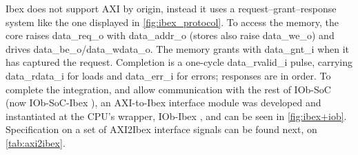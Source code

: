 Ibex does not support AXI by origin, instead it uses a request–grant–response system like the one displayed in \cref{fig:ibex_protocol}. To access the memory, the core raises data\_req\_o with data\_addr\_o (stores also raise data\_we\_o) and drives data\_be\_o/data\_wdata\_o. The memory grants with data\_gnt\_i when it has captured the request. Completion is a one-cycle data\_rvalid\_i pulse, carrying data\_rdata\_i for loads and data\_err\_i for errors; responses are in order. To complete the integration, and allow communication with the rest of IOb-SoC (now IOb-SoC-Ibex \cite{iob-soc-ibex}), an AXI-to-Ibex interface module was developed and instantiated at the \ac{CPU}'s wrapper, IOb-Ibex \cite{iob-ibex}, and can be seen in \cref{fig:ibex+iob}. Specification on a set of AXI2Ibex interface signals can be found next, on \cref{tab:axi2ibex}.

